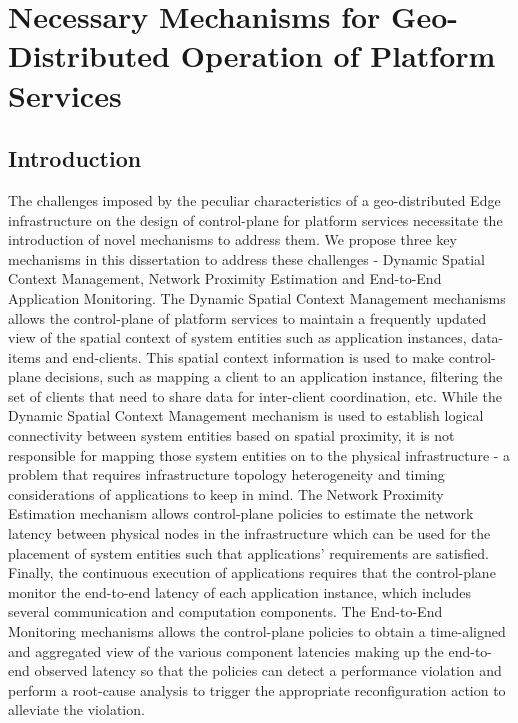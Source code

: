 \chapter{Necessary Mechanisms for Geo-Distributed Operation of Platform Services}

\section{Introduction}
The challenges imposed by the peculiar characteristics of a geo-distributed Edge infrastructure on the design of  control-plane for platform services necessitate the introduction of novel mechanisms to address them. We propose three key mechanisms in this dissertation to address these challenges - Dynamic Spatial Context Management, Network Proximity Estimation and End-to-End Application Monitoring. The Dynamic Spatial Context Management mechanisms allows the control-plane of platform services to maintain a frequently updated view of the spatial context of system entities such as application instances, data-items and end-clients. This spatial context information is used to make control-plane decisions, such as mapping a client to an application instance, filtering the set of clients that need to share data for inter-client coordination, etc. While the Dynamic Spatial Context Management mechanism is used to establish logical connectivity between system entities based on spatial proximity, it is not responsible for mapping those system entities on to the physical infrastructure - a problem that requires infrastructure topology heterogeneity and timing considerations of applications to keep in mind. The Network Proximity Estimation mechanism allows control-plane policies to estimate the network latency between physical nodes in the infrastructure which can be used for the placement of system entities such that applications' requirements are satisfied. Finally, the continuous execution of applications requires that the control-plane monitor the end-to-end latency of each application instance, which includes several communication and computation components. The End-to-End Monitoring mechanisms allows the control-plane policies to obtain a time-aligned and aggregated view of the various component latencies making up the end-to-end observed latency so that the policies can detect a performance violation and perform a root-cause analysis to trigger the appropriate reconfiguration action to alleviate the violation. 
